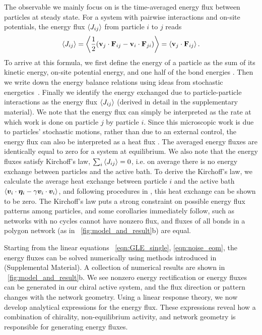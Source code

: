\documentclass[
 preprint,
 preprintnumbers,
 amsmath,amssymb,
 aps,
 pre,
 longbibliography,
 superscriptaddress,
 10pt, twocolumn
]{revtex4-1}
\begin{document}
The observable we mainly focus on is the time-averaged energy flux between particles at steady state. For a system with pairwise interactions and on-site potentials, the energy flux $\expval{J_{ij}}$ from particle $i$ to $j$ reads
\begin{equation} \label{eqn:flux_def}
    \expval{J_{ij}} = \expval{\frac{1}{2} (\mathbf{v}_j \cdot \mathbf{F}_{ij} - \mathbf{v}_i \cdot \mathbf{F}_{ji})}
    = \expval{\mathbf{v}_j \cdot \mathbf{F}_{ij}}.
\end{equation}
To arrive at this formula, we first define the energy of a particle as the sum of its kinetic energy, on-site potential energy, and one half of the bond energies \cite{Lepri2003ThermalConduction}. Then we write down the energy balance relations using ideas from stochastic energetics~\cite{Sekimoto1998LangevinEquation}. Finally we identify the energy exchanged due to particle-particle interactions as the energy flux $\expval{J_{ij}}$ (derived in detail in the supplementary material).
We note that the energy flux can simply be interpreted as the rate at which work is done on particle $j$ by particle $i$.
Since this microscopic work is due to particles' stochastic motions, rather than due to an external control, the energy flux can also be interpreted as a heat flux \cite{Sekimoto1998LangevinEquation,Lepri2003ThermalConduction}. The averaged energy fluxes are identically equal to zero for a system at equilibrium. We also note that the energy fluxes satisfy Kirchoff's law, $\sum_i \expval{J_{ij}} = 0$, i.e. on average there is no energy exchange between particles and the active bath. To derive the Kirchoff's law, we calculate the average heat exchange between particle $i$ and the active bath $\expval{\bm{v}_i \cdot \bm{\eta}_i - \gamma \bm{v}_i \cdot \bm{v}_i}$, and following procedures in \cite{Kundu2011LargeDeviations}, this heat exchange can be shown to be zero.
The Kirchoff's law puts a strong constraint on possible energy flux patterns among particles, and some corollaries immediately follow, such as networks with no cycles cannot have nonzero flux, and fluxes of all bonds in a polygon network (as in \figurename~\ref{fig:model_and_result}b) are equal.

Starting from the linear equations \eqnname~\eqref{eqn:GLE_single}, \eqref{eqn:noise_eom}, the energy fluxes can be solved numerically using methods introduced in \cite{Gardiner2009ItoCalculus,Ceriotti2010ColoredNoiseThermostats} (Supplemental Material).
A collection of numerical results are shown in \figurename~\ref{fig:model_and_result}b. We see nonzero energy rectification or energy fluxes can be generated in our chiral active system, and the flux direction or pattern changes with the network geometry.
Using a linear response theory, we now develop analytical expressions for the energy flux. These expressions reveal how a combination of chirality, non-equilibrium activity, and network geometry is responsible for generating energy fluxes.
\end{document}

